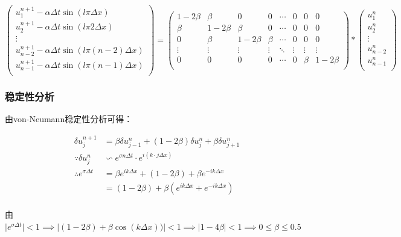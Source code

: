 \documentclass[
	20pt%
]{SUSTechHomework}
\begin{document}
$$
\begin{pmatrix}
    u^{n+1}_1 - \alpha \Delta t \sin(l \pi \Delta x) \\
    u^{n+1}_2 - \alpha \Delta t \sin(l \pi 2 \Delta x)\\
    \vdots\\
    u^{n+1}_{n-2} - \alpha \Delta t \sin(l \pi (n-2) \Delta x)\\
    u^{n+1}_{n-1} - \alpha \Delta t \sin(l \pi (n-1) \Delta x)\\
\end{pmatrix}=
\begin{pmatrix}
    1-2 \beta & \beta & 0 & 0 & \cdots & 0 & 0 & 0\\
    \beta & 1-2 \beta & \beta & 0 & \cdots & 0 & 0 & 0\\
    0 & \beta & 1-2 \beta & \beta & \cdots & 0 & 0 & 0\\
    \vdots & \vdots & \vdots & \vdots & \ddots & \vdots & \vdots & \vdots\\
    0 & 0 & 0 & 0 & \cdots & 0 & \beta & 1-2\beta \\
\end{pmatrix}*
\begin{pmatrix}
    u^{n}_1  \\
    u^{n}_2 \\
    \vdots\\
    u^{n}_{n-2}\\
    u^{n}_{n-1}\\
\end{pmatrix}
$$
\subsubsection{稳定性分析}
\qquad 由von-Neumann稳定性分析可得：

$$
\begin{aligned}
\delta u_j^{n+1} &=\beta \delta u_{j-1}^{n} + (1-2\beta)\delta u_j^{n} + \beta \delta u_{j+1}^{n}\\
\because \delta u_j^n &\backsim e^{\sigma n \Delta t} \cdot e^{i(k \cdot j \Delta x)}\\
\therefore e^{\sigma \Delta t} &= \beta e^{i k \Delta x} + (1-2\beta) + \beta e^{-i k \Delta x}\\
&= (1-2\beta) + \beta (e^{i k \Delta x} + e^{-i k \Delta x})\\
\end{aligned}
$$

由$\lvert e^{\sigma \Delta t} \rvert < 1 \implies \lvert (1-2\beta) + \beta \cos(k \Delta x)) \rvert < 1 \implies \lvert 1-4\beta \rvert < 1 \implies 0 \leq \beta \leq 0.5$
\end{document}
